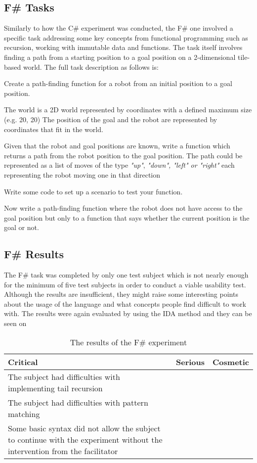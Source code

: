 \subsection{F\# Tasks}
\label{subsection:F Task}
Similarly to how the C\# experiment was conducted, the F\# one involved a specific task addressing some key concepts from functional programming such as recursion, working with immutable data and functions.
The task itself involves finding a path from a starting position to a goal position on a 2-dimensional tile-based world. The full task description as follows is:

Create a path-finding function for a robot from an initial position to a goal position.

The world is a 2D world represented by coordinates with a defined maximum size (e.g. 20, 20)
The position of the goal and the robot are represented by coordinates that fit in the world.

Given that the robot and goal positions are known, write a function which returns a path from the robot position to the goal position.
The path could be represented as a list of moves of the type \textit{"up"}, \textit{"down", "left" or "right"} each representing the robot moving one in that direction

Write some code to set up a scenario to test your function.

Now write a path-finding function where the robot does not have access to the goal position but only to a function that says whether the current position is the goal or not.


\subsection{F\# Results}
The F\# task was completed by only one test subject which is not nearly enough for the minimum of five test subjects in order to conduct a viable usability test. Although the results are insufficient, they might raise some interesting points about the usage of the language and what concepts people find difficult to work with. The results were again evaluated by using the IDA method and they can be seen on 

\begin{table} [!h]
\centering
\renewcommand{\arraystretch}{1.5}
\begin{tabular}{| p{5cm} | p{5cm} | p{5cm} |}
\hline
Critical & Serious     & Cosmetic \\ \hline
	The subject had difficulties with implementing tail recursion	 &  &  \\ \hline 
The subject had difficulties with pattern matching & &  \\ \hline
Some basic syntax did not allow the subject to continue with the experiment without the intervention from the facilitator & &  \\ \hline
\end{tabular}
\caption{The results of the F\# experiment}
\label{table:F-usability-results}
\end{table}

